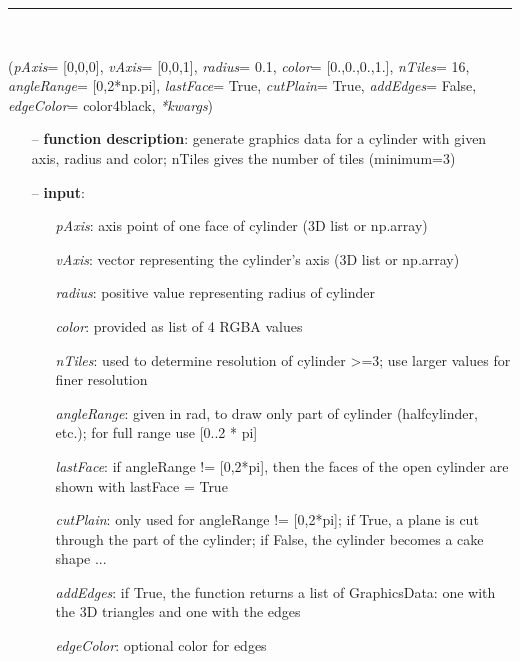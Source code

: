 \begin{itemize}[leftmargin=1.4cm]
\begin{itemize}[leftmargin=1.4cm]
\begin{itemize}[leftmargin=0.5cm]
\begin{itemize}[leftmargin=1.4cm]
\begin{itemize}[leftmargin=1.4cm]
\begin{itemize}[leftmargin=0.5cm]
\begin{itemize}[leftmargin=1.4cm]
\begin{itemize}[leftmargin=0.5cm]
%
\noindent\rule{8cm}{0.75pt}\vspace{1pt} \\ 
\begin{flushleft}
\label{sec:graphicsDataUtilities:GraphicsDataCylinder}
({\it pAxis}= [0,0,0], {\it vAxis}= [0,0,1], {\it radius}= 0.1, {\it color}= [0.,0.,0.,1.], {\it nTiles}= 16, {\it angleRange}= [0,2*np.pi], {\it lastFace}= True, {\it cutPlain}= True, {\it addEdges}= False, {\it edgeColor}= color4black, {\it **kwargs})
\end{flushleft}
\setlength{\itemindent}{0.7cm}
\begin{itemize}[leftmargin=0.7cm]
  \item[--]  {\bf function description}: generate graphics data for a cylinder with given axis, radius and color; nTiles gives the number of tiles (minimum=3)  \item[--]  {\bf input}: \vspace{-6pt}
  \begin{itemize}[leftmargin=1.2cm]
\setlength{\itemindent}{-0.7cm}
    \item[] {\it pAxis}: axis point of one face of cylinder (3D list or np.array)
    \item[] {\it   vAxis}: vector representing the cylinder's axis (3D list or np.array)
    \item[] {\it   radius}: positive value representing radius of cylinder
    \item[] {\it   color}: provided as list of 4 RGBA values
    \item[] {\it   nTiles}: used to determine resolution of cylinder >=3; use larger values for finer resolution
    \item[] {\it   angleRange}: given in rad, to draw only part of cylinder (halfcylinder, etc.); for full range use [0..2 * pi]
    \item[] {\it   lastFace}: if angleRange != [0,2*pi], then the faces of the open cylinder are shown with lastFace = True
    \item[] {\it   cutPlain}: only used for angleRange != [0,2*pi]; if True, a plane is cut through the part of the cylinder; if False, the cylinder becomes a cake shape ...
    \item[] {\it   addEdges}: if True, the function returns a list of GraphicsData: one with the 3D triangles and one with the edges
    \item[] {\it   edgeColor}: optional color for edges

\end{itemize}
\end{itemize}
\end{itemize}
\end{itemize}
\end{itemize}
\end{itemize}
\end{itemize}
\end{itemize}
\end{itemize}
\end{itemize}
